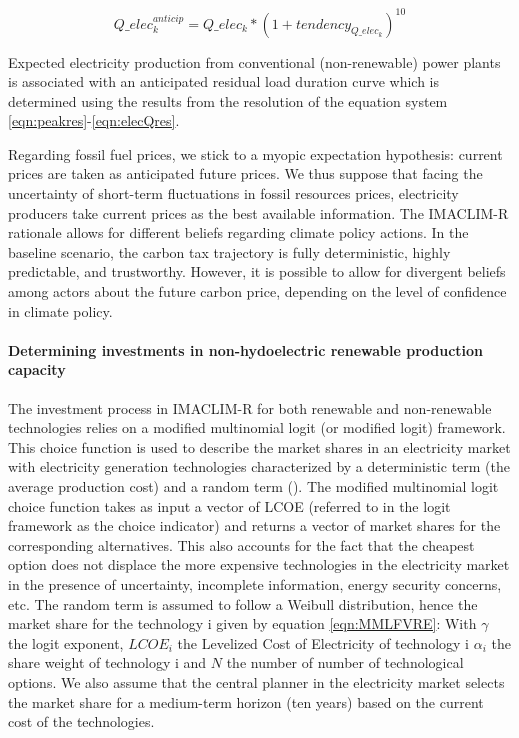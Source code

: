 \begin{dmath}
    Q\_elec_k^{anticip} = Q\_elec_k * \left( 1 + tendency_{Q\_elec_k}\right) ^{10}
    \label{eqn:elecQAnticip}
\end{dmath}

Expected electricity production from conventional (non-renewable) power plants is associated with an anticipated residual load duration curve which is determined using the results from the resolution of the equation system \ref{eqn:peakres}-\ref{eqn:elecQres}.

Regarding fossil fuel prices, we stick to a myopic expectation hypothesis: current prices are taken as anticipated future prices. We thus suppose that facing the uncertainty of short-term fluctuations in fossil resources prices, electricity producers take current prices as the best available information. The IMACLIM-R rationale allows for different beliefs regarding climate policy actions. In the baseline scenario, the carbon tax trajectory is fully deterministic, highly predictable, and trustworthy. However, it is possible to allow for divergent beliefs among actors about the future carbon price, depending on the level of confidence in climate policy.

\paragraph{Determining investments in non-hydoelectric renewable production capacity}

The investment process in IMACLIM-R for both renewable and non-renewable technologies relies on a modified multinomial logit (or modified logit) framework. This choice function is used to describe the market shares in an electricity market with electricity generation technologies characterized by a deterministic term (the average production cost) and a random term (\cite{Clarke1993}). The modified multinomial logit choice function takes as input a vector of LCOE (referred to in the logit framework as the choice indicator) and returns a vector of market shares for the corresponding alternatives. This also accounts for the fact that the cheapest option does not displace the more expensive technologies in the electricity market in the presence of uncertainty, incomplete information, energy security concerns, etc. The random term is assumed to follow a Weibull distribution, hence the market share for the technology i given by equation \ref{eqn:MMLFVRE}:
With $\gamma$ the logit exponent, $LCOE_{i}$ the Levelized Cost of Electricity of technology i $\alpha_{i}$ the share weight of technology i and $N$ the number of number of technological options. 
We also assume that the central planner in the electricity market selects the market share for a medium-term horizon (ten years) based on the current cost of the technologies.


